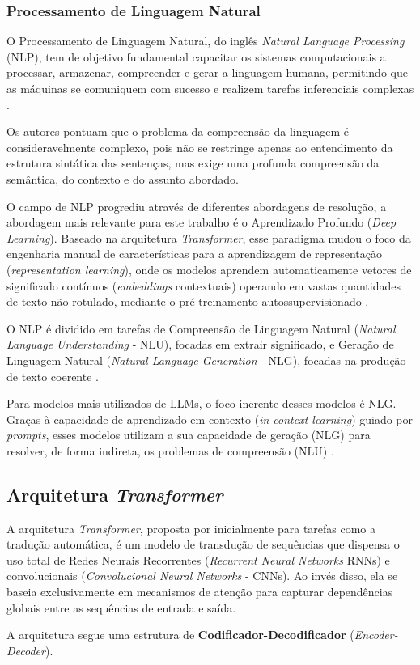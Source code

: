 \documentclass[
    12pt,                %
    openright,           %
    oneside,             %
    a4paper,             %
    english,             %
    brazil               %
]{abntex2}
\begin{document}
\subsubsection{Processamento de Linguagem Natural}
\label{sec:processamentoln}
\par
O Processamento de Linguagem Natural, do inglês \textit{Natural Language Processing} (NLP), tem de objetivo fundamental capacitar os sistemas computacionais a processar, armazenar, compreender e gerar a linguagem humana, permitindo que as máquinas se comuniquem com sucesso e realizem tarefas inferenciais complexas \cite{jurafsky2026speech}.
\par
Os autores pontuam que o problema da compreensão da linguagem é consideravelmente complexo, pois não se restringe apenas ao entendimento da estrutura sintática das sentenças, mas exige uma profunda compreensão da semântica, do contexto e do assunto abordado.
\par
O campo de NLP progrediu através de diferentes abordagens de resolução, a abordagem mais relevante para este trabalho é o Aprendizado Profundo (\textit{Deep Learning}).
Baseado na arquitetura \textit{Transformer}, esse paradigma mudou o foco da engenharia manual de características para a aprendizagem de representação (\textit{representation learning}), onde os modelos aprendem automaticamente vetores de significado contínuos (\textit{embeddings} contextuais) operando em vastas quantidades de texto não rotulado, mediante o pré-treinamento autossupervisionado \cite{jurafsky2026speech}.
\par
O NLP é dividido em tarefas de Compreensão de Linguagem Natural (\textit{Natural Language Understanding} - NLU), focadas em extrair significado, e Geração de Linguagem Natural (\textit{Natural Language Generation} - NLG), focadas na produção de texto coerente \cite{tunstall2022natural}.
\par
Para modelos mais utilizados de LLMs, o foco inerente desses modelos é NLG.
Graças à capacidade de aprendizado em contexto (\textit{in-context learning}) guiado por \textit{prompts}, esses modelos utilizam a sua capacidade de geração (NLG) para resolver, de forma indireta, os problemas de compreensão (NLU) \cite{tunstall2022natural, jurafsky2026speech}.

\subsection{Arquitetura \textit{Transformer}}
\label{sec:modelostransformers}
\par
A arquitetura \textit{Transformer}, proposta por  inicialmente para tarefas como a tradução automática, é um modelo de transdução de sequências que dispensa o uso total de Redes Neurais Recorrentes (\textit{Recurrent Neural Networks} RNNs) e convolucionais (\textit{Convolucional Neural Networks} - CNNs).
Ao invés disso, ela se baseia exclusivamente em mecanismos de atenção para capturar dependências globais entre as sequências de entrada e saída.
\par
A arquitetura segue uma estrutura de \textbf{Codificador-Decodificador} (\textit{Encoder-Decoder}).
\end{document}
